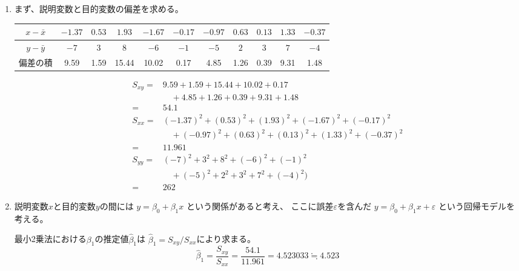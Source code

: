 \documentclass[12pt,b5paper]{ltjsarticle}
\begin{document}
\begin{enumerate}
\begin{enumerate}
       \item
            まず、説明変数と目的変数の偏差を求める。

            \hspace{-50pt}
            {\footnotesize
             \begin{tabular}{c|cccccccccc}
              $x-\bar{x}$ & $-1.37$ & $ 0.53$ & $1.93$ & $-1.67$ & $-0.17$ & $-0.97$ & $0.63$ & $0.13$ & $1.33$ & $-0.37$\\
              \hline
              $y-\bar{y}$ & $-7$ & $3$ & $8$ & $-6$ & $-1$ & $-5$ & $2$ & $3$ & $7$ & $-4$\\
              \hline \hline
              偏差の積 & 9.59 & 1.59 & 15.44 & 10.02 & 0.17 & 4.85 & 1.26 & 0.39 & 9.31 & 1.48
             \end{tabular}}

            \begin{align}
             S_{xy} = & 9.59 + 1.59 + 15.44 + 10.02 + 0.17\\
             & \quad + 4.85 + 1.26 + 0.39 + 9.31 + 1.48\\
             =& 54.1\\
             S_{xx} =& (-1.37)^2 + (0.53)^2 + (1.93)^2 + (-1.67)^2 + (-0.17)^2\\
             & \quad + (-0.97)^2 + (0.63)^2 + (0.13)^2 + (1.33)^2 + (-0.37)^2\\
             =& 11.961\\
             S_{yy} = & (-7)^2 + 3^2 + 8^2 + (-6)^2 + (-1)^2\\
             & \quad + (-5)^2 + 2^2 + 3^2 + 7^2 + (-4)^2)\\
             =& 262
            \end{align}

       \item
            説明変数$x$と目的変数$y$の間には
            $y=\beta_0 + \beta_1 x$
            という関係があると考え、
            ここに誤差$\varepsilon$を含んだ
            $y=\beta_0 + \beta_1 x + \varepsilon$
            という回帰モデルを考える。

            最小2乗法における$\beta_1$の推定値$\hat{\beta}_1$は
            $\hat{\beta}_1=S_{xy}/S_{xx}$により求まる。
            \begin{equation}
             \hat{\beta}_1 = \frac{S_{xy}}{S_{xx}} = \frac{54.1}{11.961}
              = 4.523033 \fallingdotseq 4.523
            \end{equation}


\end{enumerate}
\end{enumerate}
\end{document}
